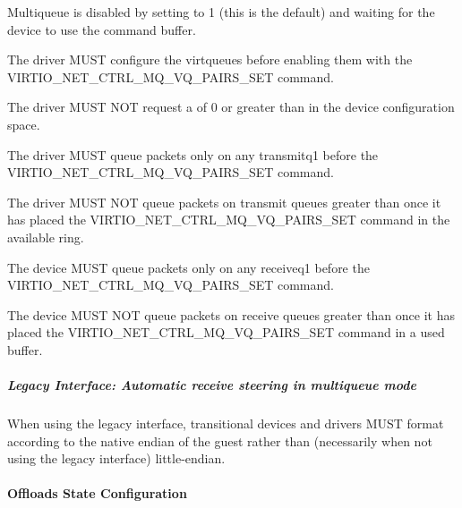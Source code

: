 Multiqueue is disabled by setting  to 1 (this is
the default) and waiting for the device to use the command buffer.


The driver MUST configure the virtqueues before enabling them with the 
VIRTIO_NET_CTRL_MQ_VQ_PAIRS_SET command.

The driver MUST NOT request a  of 0 or
greater than  in the device configuration space.

The driver MUST queue packets only on any transmitq1 before the 
VIRTIO_NET_CTRL_MQ_VQ_PAIRS_SET command.

The driver MUST NOT queue packets on transmit queues greater than
 once it has placed the VIRTIO_NET_CTRL_MQ_VQ_PAIRS_SET command in the available ring.


The device MUST queue packets only on any receiveq1 before the 
VIRTIO_NET_CTRL_MQ_VQ_PAIRS_SET command.

The device MUST NOT queue packets on receive queues greater than
 once it has placed the
VIRTIO_NET_CTRL_MQ_VQ_PAIRS_SET command in a used buffer.

\subparagraph{Legacy Interface: Automatic receive steering in multiqueue mode}\label{sec:Device Types / Network Device / Device Operation / Control Virtqueue / Automatic receive steering in multiqueue mode / Legacy Interface: Automatic receive steering in multiqueue mode}
When using the legacy interface, transitional devices and drivers
MUST format 
according to the native endian of the guest rather than
(necessarily when not using the legacy interface) little-endian.

\paragraph{Offloads State Configuration}\label{sec:Device Types / Network Device / Device Operation / Control Virtqueue / Offloads State Configuration}

